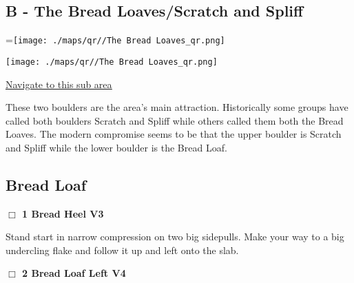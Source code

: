 	\begin{multicols}{2}

\section{B - The Bread Loaves/Scratch and Spliff}\label{sa:The Bread Loaves}
=\hbox{\texttt{[image: ./maps/qr//The Bread Loaves\_qr.png]}}%
\begin{center}
\texttt{[image: ./maps/qr//The Bread Loaves\_qr.png]}
\end{center}
\begin{center}
\underline{\textcolor{blue}{\href{http://maps.google.com/maps?q=44.43968787057463,-122.58169628966748}{Navigate to this sub area}}}
\end{center}


These two boulders are the area's main attraction. Historically some groups have called both boulders Scratch and Spliff while others called them both the Bread Loaves. The modern compromise seems to be that the upper boulder is Scratch and Spliff while the lower boulder is the Bread Loaf.\\




\needspace{10em}
\subsection*{Bread Loaf}\label{bf:Bread Loaf}




\needspace{2em}
\label{rt:Bread Heel}
\colorbox{green!20}{
\parbox{0.95\linewidth}{
\hspace{-1ex}\textbf{$\Box$
1 Bread Heel V3  
}}}
\begin{adjustwidth}{1.3em}{}			

Stand start in narrow compression on two big sidepulls. Make your way to a big undercling flake and follow it up and left onto the slab.
\end{adjustwidth}




\needspace{2em}
\label{rt:Bread Loaf Left}
\colorbox{RoyalBlue!20}{
\parbox{0.95\linewidth}{
\hspace{-1ex}\textbf{$\Box$
2 Bread Loaf Left V4  
}}}
\begin{adjustwidth}{1.3em}{}			


\end{adjustwidth}
\end{multicols}
